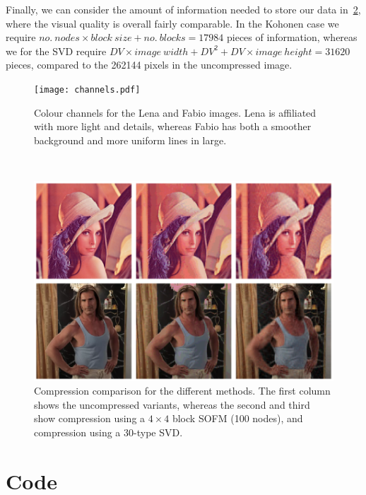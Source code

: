 \documentclass[10pt, twocolumn]{article}\usepackage[]{graphicx}\usepackage[]{color}
\theoremstyle{plain}
\begin{document}
Finally, we can consider the amount of information needed to store our data in~\cref{fig:comp}, where the visual quality is overall fairly comparable. In the Kohonen case we require $no.~nodes \times block~size + no.\ blocks = 17984$ pieces of information, whereas we for the SVD require $DV \times image~width + DV^2 + DV \times image~height = 31620$ pieces, compared to the 262144 pixels in the uncompressed image.

\printbibliography
 
    \begin{figure}[t]
      \centering
      \texttt{[image: channels.pdf]}
      \caption{Colour channels for the Lena and Fabio images. Lena is affiliated with more light and details, whereas Fabio has both a smoother background and more uniform lines in large.}
      \label{fig:channels}
    \end{figure}~\begin{figure}[b]
      \centering
      \includegraphics[scale=.6]{comp.pdf}
      \caption{Compression comparison for the different methods. The first column shows the uncompressed variants, whereas the second and third show compression using a $4 \times 4$ block SOFM (100 nodes), and compression using a 30-type SVD.}
      \label{fig:comp}
    \end{figure}

\newpage
\onecolumn
  \appendix
\section{Code}




\end{document}
